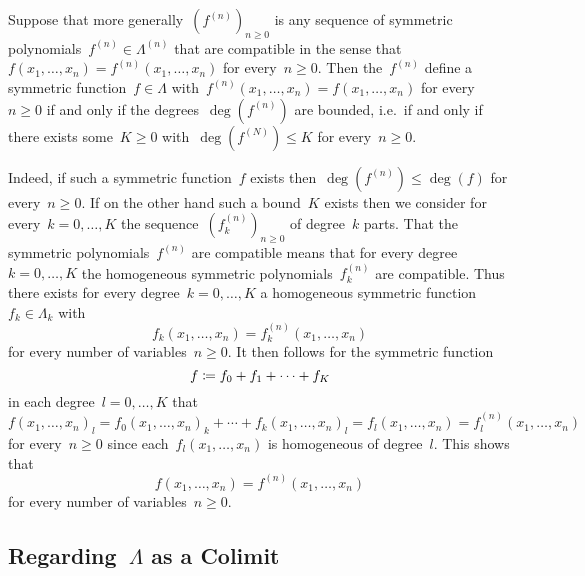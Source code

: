 \documentclass[a4paper,11pt]{scrartcl}
\begin{document}
Suppose that more generally~$( f^{(n)} )_{n \geq 0}$ is any sequence of symmetric polynomials~$f^{(n)} \in \Lambda^{(n)}$ that are compatible in the sense that~$f(x_1, \dotsc, x_n) = f^{(n)}(x_1, \dotsc, x_n)$ for every~$n \geq 0$.
Then the~$f^{(n)}$ define a symmetric function~$f \in \Lambda$ with~$f^{(n)}(x_1, \dotsc, x_n) = f(x_1, \dotsc, x_n)$ for every~$n \geq 0$ if and only if the degrees~$\deg( f^{(n)} )$ are bounded, i.e.\ if and only if there exists some~$K \geq 0$ with~$\deg( f^{(N)} ) \leq K$ for every~$n \geq 0$.

Indeed, if such a symmetric function~$f$ exists then~$\deg( f^{(n)} ) \leq \deg(f)$ for every~$n \geq 0$.
If on the other hand such a bound~$K$ exists then we consider for every~$k = 0, \dotsc, K$ the sequence~$( f^{(n)}_k )_{n \geq 0}$ of degree~$k$ parts.
That the symmetric polynomials~$f^{(n)}$ are compatible means that for every degree~$k = 0, \dotsc, K$ the homogeneous symmetric polynomials~$f^{(n)}_k$ are compatible.
Thus there exists for every degree~$k = 0, \dotsc, K$ a homogeneous symmetric function~$f_k \in \Lambda_k$ with
\[
f_k(x_1, \dots, x_n)
=
f^{(n)}_k(x_1, \dotsc, x_n)
\]
for every number of variables~$n \geq 0$.
It then follows for the symmetric function
\[
f
\coloneqq
f_0 + f_1 + \dotsb + f_K
\]
in each degree~$l = 0, \dotsc, K$ that
\[
f(x_1, \dotsc, x_n)_l
=
f_0(x_1, \dotsc, x_n)_k
+
\dotsb
+
f_k(x_1, \dotsc, x_n)_l
=
f_l(x_1, \dotsc, x_n)
=
f^{(n)}_l(x_1, \dotsc, x_n)
\]
for every~$n \geq 0$ since each~$f_l(x_1, \dotsc, x_n)$ is homogeneous of degree~$l$.
This shows that
\[
f(x_1, \dotsc, x_n)
=
f^{(n)}(x_1, \dotsc, x_n)
\]
for every number of variables~$n \geq 0$.



\subsection{Regarding~$\Lambda$ as a Colimit}
\label{symmetric functions as colimit}
\end{document}
